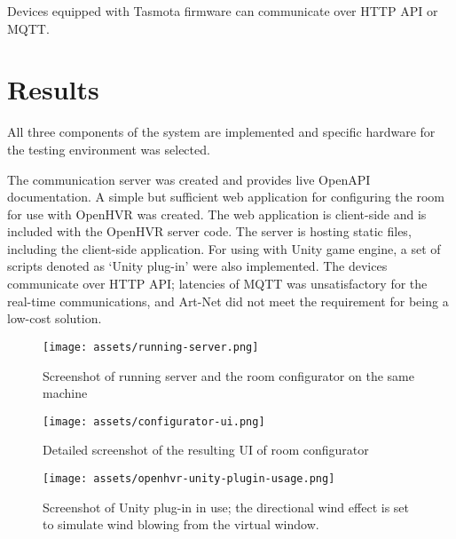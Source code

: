 Devices equipped with Tasmota firmware can communicate over HTTP API or MQTT.

\hypertarget{x-results}{\section{Results}}
All three components of the system are implemented and specific hardware
for the testing environment was selected.


The communication server was created and provides live OpenAPI documentation.
A simple but sufficient web application for configuring the room for use with
OpenHVR was created. The web application is client-side and is included with
the OpenHVR server code. The server is hosting static files,
including the client-side application.
For using with Unity game engine, a set of scripts denoted as `Unity plug-in'
were also implemented. The devices communicate over HTTP API;
latencies of MQTT was unsatisfactory for the real-time communications, and Art-Net
did not meet the requirement for being a low-cost solution.

\begin{figure}[h]{}
\centering\texttt{[image: assets/running-server.png]}
\caption{Screenshot of running server and the room configurator on the same machine}
\end{figure}

\begin{figure}[h]{}
\centering\texttt{[image: assets/configurator-ui.png]}
\caption{Detailed screenshot of the resulting UI of room configurator}
\end{figure}

\begin{figure}[h]{}
\centering\texttt{[image: assets/openhvr-unity-plugin-usage.png]}
\caption{Screenshot of Unity plug-in in use; the directional wind effect is set to simulate wind blowing from the virtual window.}
\end{figure}
